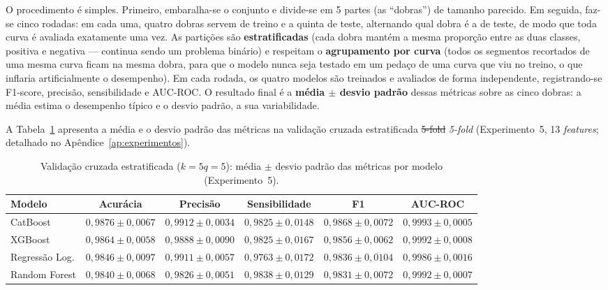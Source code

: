 \documentclass[msc]{on} %
\makeatletter
\providecommand{\DIFaddtex}[1]{{\protect\color{red}#1}} %
\providecommand{\DIFdeltex}[1]{{\protect\color{red}\sout{#1}}} %
\providecommand{\DIFaddbegin}{} %
\providecommand{\DIFaddend}{} %
\providecommand{\DIFdelbegin}{} %
\providecommand{\DIFdelend}{} %
\providecommand{\DIFaddFL}[1]{\DIFadd{#1}} %
\providecommand{\DIFdelFL}[1]{\DIFdel{#1}} %
\providecommand{\DIFaddbeginFL}{} %
\providecommand{\DIFaddendFL}{} %
\providecommand{\DIFdelbeginFL}{} %
\providecommand{\DIFdelendFL}{} %
\providecommand{\DIFadd}[1]{\texorpdfstring{\DIFaddtex{#1}}{#1}} %
\providecommand{\DIFdel}[1]{\texorpdfstring{\DIFdeltex{#1}}{}} %
\let\sout@orig\sout %
\renewcommand{\sout}[1]{\ifmmode\text{\sout@orig{\ensuremath{#1}}}\else\sout@orig{#1}\fi} %
\makeatother
\begin{document}
O procedimento é simples. Primeiro, embaralha-se o conjunto e divide-se em 5 partes (as ``dobras'') de tamanho parecido. Em seguida, faz-se cinco rodadas: em cada uma, quatro dobras servem de treino e a quinta de teste, alternando qual dobra é a de teste, de modo que toda curva é avaliada exatamente uma vez. As partições são \textbf{estratificadas} (cada dobra mantém a mesma proporção entre as duas classes, positiva e negativa --- continua sendo um problema binário) e respeitam o \textbf{agrupamento por curva} (todos os segmentos recortados de uma mesma curva ficam na mesma dobra, para que o modelo nunca seja testado em um pedaço de uma curva que viu no treino, o que inflaria artificialmente o desempenho). Em cada rodada, os quatro modelos são treinados e avaliados de forma independente, registrando-se F1-score, precisão, sensibilidade e AUC-ROC. O resultado final é a \textbf{média $\pm$ desvio padrão} dessas métricas sobre as cinco dobras: a média estima o desempenho típico e o desvio padrão, a sua variabilidade.

A Tabela~\ref{tab:cross_validation} apresenta a média e o desvio padrão das métricas na validação cruzada estratificada \DIFdelbegin \DIFdel{5-fold }\DIFdelend \DIFaddbegin \textit{\DIFadd{5-fold}} \DIFaddend (Experimento~5, 13 \textit{features}; detalhado no Apêndice~\ref{ap:experimentos}).

\begin{table}[htbp]
\centering
\small
\caption{Validação cruzada estratificada (\DIFdelbeginFL \DIFdelFL{$k=5$}\DIFdelendFL \DIFaddbeginFL \DIFaddFL{$q=5$}\DIFaddendFL ): média $\pm$ desvio padrão das métricas por modelo (Experimento~5).}
\label{tab:cross_validation}
\begin{tabular}{@{}lccccc@{}}
\hline
\textbf{Modelo} & \textbf{Acurácia} & \textbf{Precisão} & \textbf{Sensibilidade} & \textbf{F1} & \textbf{AUC-ROC} \\
\hline
CatBoost          & $0{,}9876 \pm 0{,}0067$ & $0{,}9912 \pm 0{,}0034$ & $0{,}9825 \pm 0{,}0148$ & $0{,}9868 \pm 0{,}0072$ & $0{,}9993 \pm 0{,}0005$ \\
XGBoost           & $0{,}9864 \pm 0{,}0058$ & $0{,}9888 \pm 0{,}0090$ & $0{,}9825 \pm 0{,}0167$ & $0{,}9856 \pm 0{,}0062$ & $0{,}9992 \pm 0{,}0008$ \\
Regressão Log.    & $0{,}9846 \pm 0{,}0097$ & $0{,}9911 \pm 0{,}0057$ & $0{,}9763 \pm 0{,}0172$ & $0{,}9836 \pm 0{,}0104$ & $0{,}9986 \pm 0{,}0016$ \\
Random Forest     & $0{,}9840 \pm 0{,}0068$ & $0{,}9826 \pm 0{,}0051$ & $0{,}9838 \pm 0{,}0129$ & $0{,}9831 \pm 0{,}0072$ & $0{,}9992 \pm 0{,}0007$ \\
\hline
\end{tabular}
\end{table}
\end{document}
